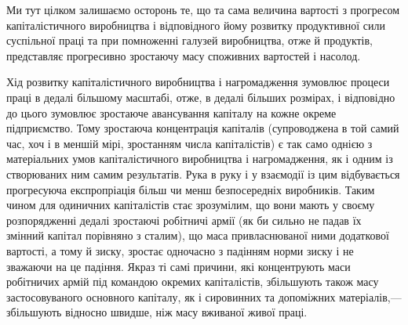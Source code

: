 Ми тут цілком залишаємо осторонь те, що та сама величина
вартості з прогресом капіталістичного виробництва і відповідного
йому розвитку продуктивної сили суспільної праці та при помноженні
галузей виробництва, отже й продуктів, представляє прогресивно
зростаючу масу споживних вартостей і насолод.

Хід розвитку капіталістичного виробництва і нагромадження
зумовлює процеси праці в дедалі більшому масштабі, отже, в дедалі
більших розмірах, і відповідно до цього зумовлює зростаюче
авансування капіталу на кожне окреме підприємство. Тому
зростаюча концентрація капіталів (супроводжена в той самий
час, хоч і в меншій мірі, зростанням числа капіталістів) є так
само однією з матеріальних умов капіталістичного виробництва
і нагромадження, як і одним із створюваних ним самим результатів.
Рука в руку і у взаємодії із цим відбувається прогресуюча експропріація
більш чи менш безпосередніх виробників. Таким чином
для одиничних капіталістів стає зрозумілим, що вони мають
у своєму розпорядженні дедалі зростаючі робітничі армії (як би
сильно не падав їх змінний капітал порівняно з сталим), що маса
привласнюваної ними додаткової вартості, а тому й зиску, зростає
одночасно з падінням норми зиску і не зважаючи на це падіння.
Якраз ті самі причини, які концентрують маси робітничих армій
під командою окремих капіталістів, збільшують також масу застосовуваного
основного капіталу, як і сировинних та допоміжних
матеріалів,— збільшують відносно швидше, ніж масу вживаної
живої праці.
